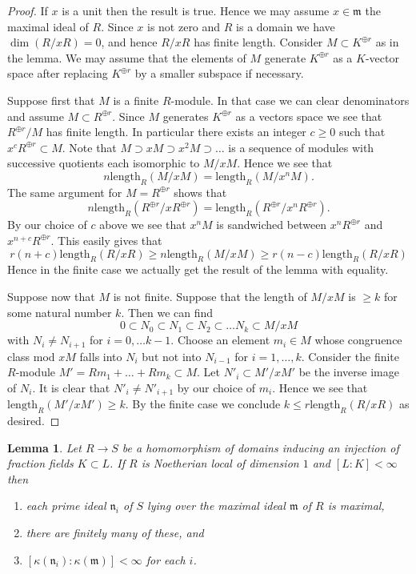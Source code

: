\documentclass{amsart}
\theoremstyle{plain}
\newtheorem{lemma}[subsection]{Lemma}
\theoremstyle{definition}
\theoremstyle{remark}
\numberwithin{equation}{subsection}
\begin{document}
\begin{proof}
If $x$ is a unit then the result is true. Hence we may assume
$x \in \mathfrak m$ the maximal ideal of $R$. Since $x$ is not
zero and $R$ is a domain we have $\dim(R/xR) = 0$, and hence
$R/xR$ has finite length. Consider $M \subset K^{\oplus r}$ as
in the lemma. We may assume that the elements of $M$ generate
$K^{\oplus r}$ as a $K$-vector space after replacing $K^{\oplus r}$
by a smaller subspace if necessary.

\medskip\noindent
Suppose first that $M$ is a finite $R$-module. In that case we can clear
denominators and assume $M \subset R^{\oplus r}$. Since
$M$ generates $K^{\oplus r}$ as a vectors space we see that
$R^{\oplus r}/M$ has finite length. In particular there exists
an integer $c \geq 0$ such that $x^cR^{\oplus r} \subset M$.
Note that $M \supset xM \supset x^2M \supset \ldots$ is a sequence of
modules with successive quotients each isomorphic to $M/xM$. Hence
we see that
$$
n \text{length}_R(M/xM) = \text{length}_R(M/x^nM).
$$
The same argument for $M = R^{\oplus r}$ shows that
$$
n \text{length}_R(R^{\oplus r}/xR^{\oplus r}) =
\text{length}_R(R^{\oplus r}/x^nR^{\oplus r}).
$$
By our choice of $c$ above we see that $x^nM$ is sandwiched between
$x^n R^{\oplus r}$ and $x^{n + c}R^{\oplus r}$. This easily gives that
$$
r(n + c) \text{length}_R(R/xR)
\geq
n \text{length}_R(M/xM)
\geq
r (n - c) \text{length}_R(R/xR)
$$
Hence in the finite case we actually get the result of the lemma with
equality.

\medskip\noindent
Suppose now that $M$ is not finite. Suppose that the length of $M/xM$ is
$\geq k$ for some natural number $k$. Then we can find
$$
0 \subset N_0 \subset N_1 \subset N_2 \subset \ldots N_k \subset M/xM
$$
with $N_i \not = N_{i + 1}$ for $i = 0, \ldots k - 1$.
Choose an element $m_i \in M$ whose congruence class mod $xM$ falls
into $N_i$ but not into $N_{i - 1}$ for $i = 1, \ldots, k$.
Consider the finite $R$-module $M' = Rm_1 + \ldots + Rm_k \subset M$.
Let $N'_i \subset M'/xM'$ be the inverse image of $N_i$.
It is clear that $N'_i \not =N'_{i + 1}$ by our choice of $m_i$.
Hence we see that $\text{length}_R(M'/xM') \geq k$. By the
finite case we conclude $k \leq r\text{length}_R(R/xR)$
as desired.
\end{proof}


\begin{lemma}
\label{lemma-finite-extension-residue-fields-dimension-1}
Let $R \to S$ be a homomorphism of domains inducing an
injection of fraction fields $K \subset L$. If $R$ is Noetherian
local of dimension $1$ and $[L : K] < \infty$ then
\begin{enumerate}
\item each prime ideal $\mathfrak n_i$ of $S$ lying over
the maximal ideal $\mathfrak m$ of $R$ is maximal,
\item there are finitely many of these, and
\item $[\kappa(\mathfrak n_i) : \kappa(\mathfrak m)] < \infty$ for each $i$.
\end{enumerate}
\end{lemma}
\end{document}
